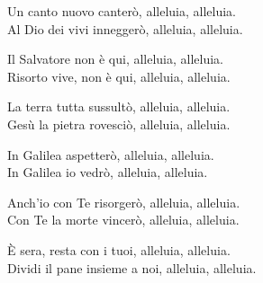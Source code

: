 
\strofa Un canto nuovo canterò, alleluia, alleluia.\\
Al Dio dei vivi inneggerò, alleluia, alleluia.

\spazio

\strofa Il Salvatore non è qui, alleluia, alleluia.\\
Risorto vive, non è qui, alleluia, alleluia.

\spazio

\strofa La terra tutta sussultò, alleluia, alleluia.\\
Gesù la pietra rovesciò, alleluia, alleluia.

\spazio

\strofa In Galilea aspetterò, alleluia, alleluia.\\
In Galilea io vedrò, alleluia, alleluia.

\spazio

\strofa Anch'io con Te risorgerò, alleluia, alleluia.\\
Con Te la morte vincerò, alleluia, alleluia.

\spazio

\strofa È sera, resta con i tuoi, alleluia, alleluia.\\
Dividi il pane insieme a noi, alleluia, alleluia.